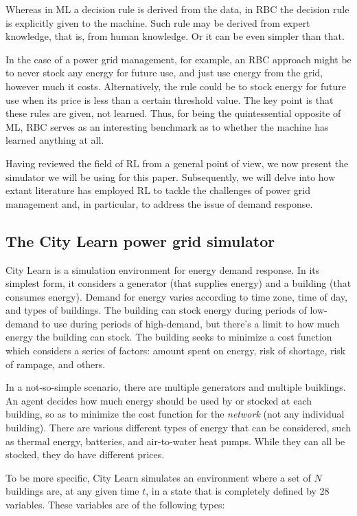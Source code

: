 \documentclass{article}
\begin{document}
Whereas in ML a decision rule is derived from the data, in RBC the decision rule is explicitly given to the machine. Such rule may be derived from expert knowledge, that is, from human knowledge. Or it can be even simpler than that.

In the case of a power grid management, for example, an RBC approach might be to never stock any energy for future use, and just use energy from the grid, however much it costs. Alternatively, the rule could be to stock energy for future use when its price is less than a certain threshold value. The key point is that these rules are given, not learned. Thus, for being the quintessential opposite of ML, RBC serves as an interesting benchmark as to whether the machine has learned anything at all.

Having reviewed the field of RL from a general point of view, we now present the simulator we will be using for this paper. Subsequently, we will delve into how extant literature has employed RL to tackle the challenges of power grid management and, in particular, to address the issue of demand response.

\subsection{The City Learn power grid simulator}

City Learn \cite{Vazquez-Canteli2019} is a simulation environment for energy demand response. In its simplest form, it considers a generator (that supplies energy) and a building (that consumes energy). Demand for energy varies according to time zone, time of day, and types of buildings. The building can stock energy during periods of low-demand to use during periods of high-demand, but there's a limit to how much energy the building can stock. The building seeks to minimize a cost function which considers a series of factors: amount spent on energy, risk of shortage, risk of rampage, and others.

In a not-so-simple scenario, there are multiple generators and multiple buildings. An agent decides how much energy should be used by or stocked at each building, so as to minimize the cost function for the \emph{network} (not any individual building). There are various different types of energy that can be considered, such as thermal energy, batteries, and air-to-water heat pumps. While they can all be stocked, they do have different prices.

To be more specific, City Learn simulates an environment where a set of $N$ buildings are, at any given time $t$, in a state that is completely defined by 28 variables. These variables are of the following types:
\end{document}
